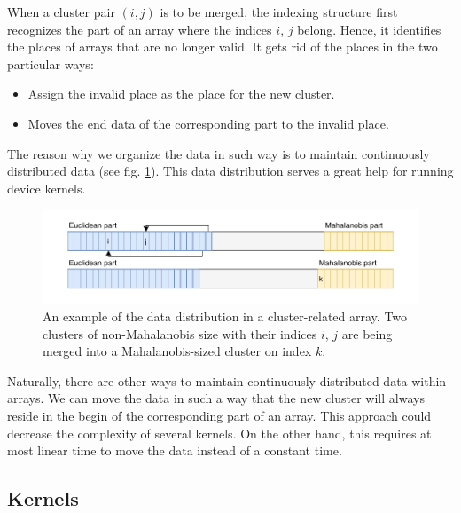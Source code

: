 When a cluster pair $(i,j)$ is to be merged, the indexing structure first recognizes the part of an array where the indices $i$, $j$ belong. Hence, it identifies the places of arrays that are no longer valid. It gets rid of the places in the two particular ways:
\begin{itemize}
	\item Assign the invalid place as the place for the new cluster.
	\item Moves the end data of the corresponding part to the invalid place.
\end{itemize}
The reason why we organize the data in such way is to maintain continuously distributed data (see fig. \ref{fig03:data_order}). This data distribution serves a great help for running device kernels.

\begin{figure}\centering
	\includegraphics[width=\textwidth]{img/data}
	\caption{An example of the data distribution in a cluster-related array. Two clusters of non-Mahalanobis size with their indices $i$, $j$ are being merged into a Mahalanobis-sized cluster on index $k$.}
	\label{fig03:data_order}
\end{figure}

\begin{rem}
	Naturally, there are other ways to maintain continuously distributed data within arrays. We can move the data in such a way that the new cluster will always reside in the begin of the corresponding part of an array. This approach could decrease the complexity of several kernels. On the other hand, this requires at most linear time to move the data instead of a constant time.
\end{rem}

\subsection{Kernels}

